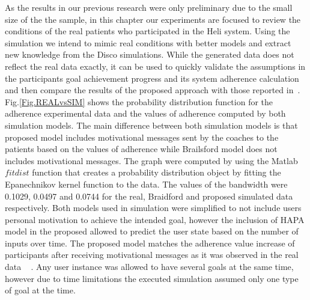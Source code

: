 \documentclass{llncs}
\begin{document}
As the results in our previous research were only preliminary due to the small size of the the sample, in this chapter our experiments are focused to review the conditions of the real patients who participated in the Heli system. Using the simulation we intend to mimic real conditions with better models and extract new knowledge from the Disco simulations.  While the generated data does not reflect the real data exactly, it can be used to quickly validate the assumptions in the participants goal achievement progress and its system adherence calculation and then compare the results of the proposed approach with those reported in~\cite{Brailsford2016}. Fig.\ref{Fig.REALvsSIM} shows the probability distribution function for the adherence experimental data and the values of adherence computed by both simulation models. The main difference between both simulation models is that proposed model includes motivational messages sent by the coaches to the patients based on the values of adherence while Brailsford model does not includes motivational messages. The graph were computed by using the Matlab $fitdist$ function that creates a probability distribution object by fitting the Epanechnikov kernel function to the data. The values of the bandwidth were 0.1029, 0.0497 and 0.0744 for the real, Braidford and proposed simulated data respectively. Both models used in simulation were simplified to not include users personal motivation to achieve the intended goal, however the inclusion of HAPA model in the proposed allowed to predict the user state based on the number of inputs over time. The proposed model matches the adherence value increase of participants after receiving motivational messages as it was observed in the real data ~\cite{rem2017} .  Any user instance was allowed to have several goals at the same time, however due to time limitations the executed simulation assumed only one type of goal at the time. 
\end{document}
